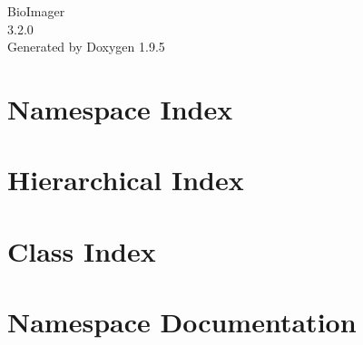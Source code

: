 \documentclass[twoside]{book}
\newcommand{\+}{\discretionary{\mbox{\scriptsize$\hookleftarrow$}}{}{}}
\newcommand{\clearemptydoublepage}{%
    \newpage{\pagestyle{empty}\cleardoublepage}%
  }
\begin{document}
  \raggedbottom
    \hypersetup{pageanchor=false,
                bookmarksnumbered=true,
                pdfencoding=unicode
               }
  \begin{titlepage}
  \vspace*{7cm}
  \begin{center}%
  {\Large Bio\+Imager}\\
  [1ex]\large 3.\+2.\+0 \\
  \vspace*{1cm}
  {\large Generated by Doxygen 1.9.5}\\
  \end{center}
  \end{titlepage}
  \clearemptydoublepage
  \tableofcontents
  \clearemptydoublepage
  \hypersetup{pageanchor=true}
\chapter{Namespace Index}

\chapter{Hierarchical Index}

\chapter{Class Index}

\chapter{Namespace Documentation}



\end{document}

